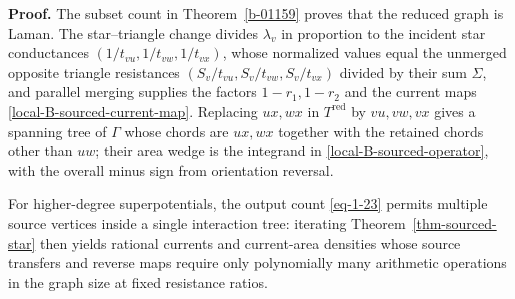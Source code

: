 \documentclass[11pt]{article}
\numberwithin{equation}{section}
\numberwithin{figure}{section}
\numberwithin{table}{section}
\begin{document}
\begin{proofbox}
\textbf{Proof.} The subset count in Theorem~\ref{b-01159} proves that the reduced graph is Laman. The star--triangle change divides $\lambda_v$ in proportion to the incident star conductances $(1/t_{vu},1/t_{vw},1/t_{vx})$, whose normalized values equal the unmerged opposite triangle resistances $(S_v/t_{vu},S_v/t_{vw},S_v/t_{vx})$ divided by their sum $\Sigma$, and parallel merging supplies the factors $1-r_1,1-r_2$ and the current maps \eqref{local-B-sourced-current-map}. Replacing $ux,wx$ in $T^{\mathrm{red}}$ by $vu,vw,vx$ gives a spanning tree of $\Gamma$ whose chords are $ux,wx$ together with the retained chords other than $uw$; their area wedge is the integrand in \eqref{local-B-sourced-operator}, with the overall minus sign from orientation reversal.~\hfill\qedsymbol
\end{proofbox}

For higher-degree superpotentials, the output count \eqref{eq-1-23} permits multiple source vertices inside a single interaction tree: iterating Theorem~\ref{thm-sourced-star} then yields rational currents and current-area densities whose source transfers and reverse maps require only polynomially many arithmetic operations in the graph size at fixed resistance ratios.
\end{document}
